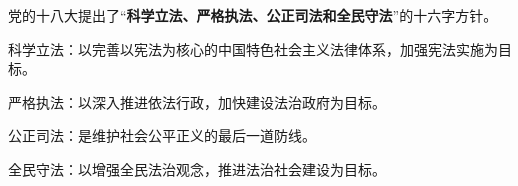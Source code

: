 {党的十八大提出了``}\textbf{{科学立法、严格执法、公正司法}{和全民守法}}{''的十六字方针}\textbf{{}{}}{。}

{{科学立法}：以完善以宪法为核心的中国特色社会主义法律体系，加强宪法实施为目标。}

{{严格执法}：以深入推进依法行政，加快建设法治政府为目标。}

{{公正司法}：是维护社会公平正义的最后一道防线。}

{{全民守法}：以增强全民法治观念，推进法治社会建设为目标。}
